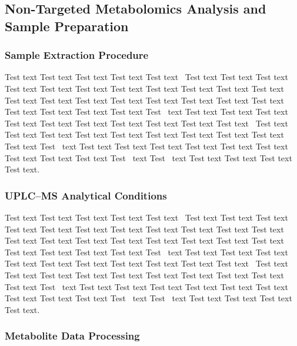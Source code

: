\documentclass[animals,article,accept,moreauthors,pdftex]{Definitions/mdpi}
\begin{document}
\subsection{Non-Targeted Metabolomics Analysis and Sample Preparation \label{sect:sec2dot2-animals-4264543}}

\subsubsection{Sample Extraction Procedure \label{sect:sec2dot2dot1-animals-4264543}}

Test text Test text Test text Test text Test text~\cite{B1-animals-4264543} Test text Test text Test text Test text Test text Test text Test text Test text Test text Test text Test text Test text Test text Test text Test text Test text Test text Test text Test text Test text Test text Test text Test text Test~\cite{B2-animals-4264543} text Test text Test text Test text Test text Test text Test text Test text Test text Test text Test text~\cite{B3-animals-4264543} Test text Test text Test text Test text Test text Test text Test text Test text Test text Test text Test~\cite{B4-animals-4264543} text Test text Test text Test text Test text Test text Test text Test text Test text Test text Test~\cite{B5-animals-4264543} text Test~\cite{B6-animals-4264543} text Test text Test text Test text Test text.


\subsubsection{UPLC--MS Analytical Conditions \label{sect:sec2dot2dot2-animals-4264543}}

Test text Test text Test text Test text Test text~\cite{B1-animals-4264543} Test text Test text Test text Test text Test text Test text Test text Test text Test text Test text Test text Test text Test text Test text Test text Test text Test text Test text Test text Test text Test text Test text Test text Test~\cite{B2-animals-4264543} text Test text Test text Test text Test text Test text Test text Test text Test text Test text Test text~\cite{B3-animals-4264543} Test text Test text Test text Test text Test text Test text Test text Test text Test text Test text Test~\cite{B4-animals-4264543} text Test text Test text Test text Test text Test text Test text Test text Test text Test text Test~\cite{B5-animals-4264543} text Test~\cite{B6-animals-4264543} text Test text Test text Test text Test text.


\subsubsection{Metabolite Data Processing \label{sect:sec2dot2dot3-animals-4264543}}
\end{document}
